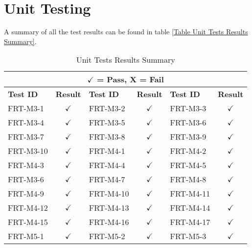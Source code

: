 \documentclass[12pt, titlepage]{article}
\begin{document}
\newpage

\section{Unit Testing}

A summary of all the test results can be found in table \ref{Table Unit Tests Results Summary}.

\begin{longtable}{|l|c|l|c|l|c|}
	\caption{Unit Tests Results Summary} \label{Table Unit Tests Result Summary}                                 \\
	\toprule
	\multicolumn{6}{c}{$\checkmark$ = Pass, X = Fail}                                                            \\
	\toprule
	\textbf{Test ID} & \textbf{Result} & \textbf{Test ID} & \textbf{Result} & \textbf{Test ID} & \textbf{Result} \\
	\midrule
	FRT-M3-1         & $\checkmark$    & FRT-M3-2         & $\checkmark$    & FRT-M3-3         & $\checkmark$    \\
	\midrule
	FRT-M3-4         & $\checkmark$    & FRT-M3-5         & $\checkmark$    & FRT-M3-6         & $\checkmark$    \\
	\midrule
	FRT-M3-7         & $\checkmark$    & FRT-M3-8         & $\checkmark$    & FRT-M3-9         & $\checkmark$    \\
	\midrule
	FRT-M3-10        & $\checkmark$    & FRT-M4-1         & $\checkmark$    & FRT-M4-2         & $\checkmark$    \\
	\midrule
	FRT-M4-3         & $\checkmark$    & FRT-M4-4         & $\checkmark$    & FRT-M4-5         & $\checkmark$    \\
	\midrule
	FRT-M3-6         & $\checkmark$    & FRT-M4-7         & $\checkmark$    & FRT-M4-8         & $\checkmark$    \\
	\midrule
	FRT-M4-9         & $\checkmark$    & FRT-M4-10        & $\checkmark$    & FRT-M4-11        & $\checkmark$    \\
	\midrule
	FRT-M4-12        & $\checkmark$    & FRT-M4-13        & $\checkmark$    & FRT-M4-14        & $\checkmark$    \\
	\midrule
	FRT-M4-15        & $\checkmark$    & FRT-M4-16        & $\checkmark$    & FRT-M4-17        & $\checkmark$    \\
	\midrule
	FRT-M5-1         & $\checkmark$    & FRT-M5-2         & $\checkmark$    & FRT-M5-3         & $\checkmark$    \\
	\midrule

\end{longtable}
\end{document}
